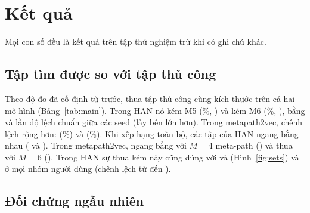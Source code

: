 \section{Kết quả}
\label{sec:results}

Mọi con số đều là kết quả trên tập thử nghiệm trừ khi có ghi chú khác.

\subsection{Tập tìm được so với tập thủ công}
\label{sec:res-main}

Theo độ đo đã cố định từ trước,  thua tập thủ công cùng kích thước trên cả hai mô hình
(Bảng~\ref{tab:main}). Trong HAN nó kém M5  (\%,
) và kém M6  (\%,
), bằng  và  lần độ lệch chuẩn giữa các
seed (lấy bên lớn hơn). Trong metapath2vec, chênh lệch rộng hơn: 
(\%) và  (\%). Khi xếp hạng
toàn bộ, các tập của HAN ngang bằng nhau ( và ). Trong
metapath2vec,  ngang bằng với $M = 4$ meta-path () và thua với $M = 6$ (). Trong
HAN sự thua kém này cũng đúng với  và  (Hình~\ref{fig:sets}) và ở mọi nhóm người
dùng (chênh lệch từ  đến ).



\subsection{Đối chứng ngẫu nhiên}
\label{sec:res-random}

